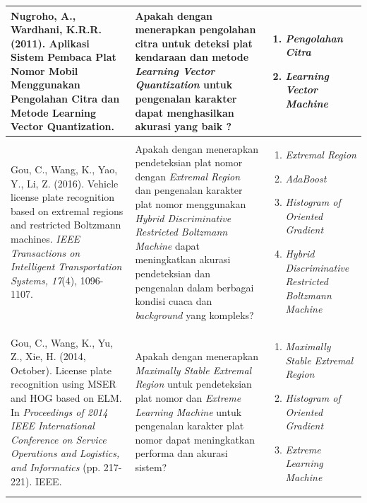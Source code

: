 \begin{small}
\begin{longtable}{ |p{5cm}|p{3.5cm}|p{3.6cm}| }
\hline
Nugroho, A., Wardhani, K.R.R. (2011). Aplikasi Sistem Pembaca Plat Nomor Mobil Menggunakan Pengolahan Citra dan Metode Learning Vector Quantization. & Apakah dengan menerapkan pengolahan citra untuk deteksi plat kendaraan dan metode \textit{Learning Vector Quantization} untuk pengenalan karakter dapat menghasilkan akurasi yang baik ? &
\begin{enumerate}[wide, labelwidth=!, labelindent=0pt, topsep=0pt]
	\item \textit{Pengolahan Citra}
	\item \textit{Learning Vector Machine}
\end{enumerate}\\
\hline
 Gou, C., Wang, K., Yao, Y., Li, Z. (2016). Vehicle license plate recognition based on extremal regions and restricted Boltzmann machines. \emph{IEEE Transactions on Intelligent Transportation Systems, 17}(4), 1096-1107. & Apakah dengan menerapkan pendeteksian plat nomor dengan \textit{Extremal Region} dan pengenalan karakter plat nomor menggunakan \textit{Hybrid Discriminative Restricted Boltzmann Machine} dapat meningkatkan akurasi pendeteksian dan pengenalan dalam berbagai kondisi cuaca dan \textit{background} yang kompleks? & 
\begin{enumerate}[wide, labelwidth=!, labelindent=0pt, topsep=0pt]
\item \textit{Extremal Region}
\item \textit{AdaBoost}
\item \textit{Histogram of Oriented Gradient}
\item \textit{Hybrid Discriminative Restricted Boltzmann Machine} 
\end{enumerate}\\
\hline
 Gou, C., Wang, K., Yu, Z., Xie, H. (2014, October). License plate recognition using MSER and HOG based on ELM. In \emph{Proceedings of 2014 IEEE International Conference on Service Operations and Logistics, and Informatics} (pp. 217-221). IEEE. & Apakah dengan menerapkan \textit{Maximally Stable Extremal Region} untuk pendeteksian plat nomor dan \textit{Extreme Learning Machine} untuk pengenalan karakter plat nomor dapat meningkatkan performa dan akurasi sistem? & 
\begin{enumerate}[wide, labelwidth=!, labelindent=0pt, topsep=0pt]
\item \textit{Maximally Stable Extremal Region}
\item \textit{Histogram of Oriented Gradient}
\item \textit{Extreme Learning Machine}

\end{enumerate}
\end{longtable}
\end{small}
